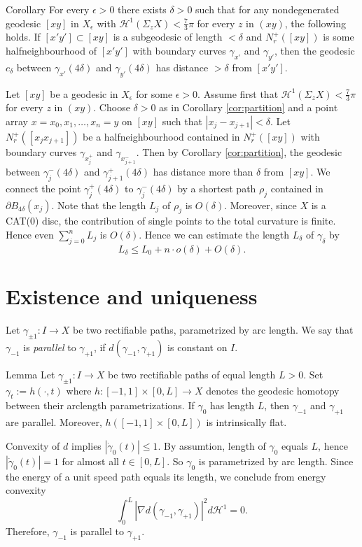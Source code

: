 \documentclass[a4paper,10pt]{amsart}
\begin{document}
\begin{thm}{Corollary}\label{cor:partition}
For every $\epsilon>0$ there exists $\delta>0$ such that for any nondegenerated geodesic $[xy]$ 
in $X_\epsilon$ with $\mathcal{H}^1(\Sigma_z X)< \frac{7}{3}\pi$
for every $z$ in $(xy)$, the following holds. If $[x'y']\subset[xy]$ is a subgeodesic of length $<\delta$ and $N^+_r([xy])$ is some halfneighbourhood of $[x'y']$ with boundary curves $\gamma_{x'}$ and $\gamma_{y'}$, 
then the geodesic $c_\delta$ between  $\gamma_{x'}(4\delta)$ and $\gamma_{y'}(4\delta)$ has distance $>\delta$
from $[x'y']$.
\end{thm}
Let $[xy]$ be a geodesic in $X_\epsilon$ for some $\epsilon>0$. Assume first that $\mathcal{H}^1(\Sigma_z X)< \frac{7}{3}\pi$
for every $z$ in $(xy)$. Choose $\delta>0$ as in Corollary \ref{cor:partition} and a point array
$x=x_0,x_1,\ldots,x_n=y$ on $[xy]$ such that $|x_j-x_{j+1}|<\delta$. Let $N_r^ +([x_j x_{j+1}])$ be a halfneighbourhood contained in $N_r^ +([x y])$
with boundary curves $\gamma_{x_j^ +}$ and $\gamma_{x_{j+1}^ -}$. Then by Corollary \ref{cor:partition}, the geodesic between $\gamma_j^ -(4\delta)$
and $\gamma_{j+1}^ +(4\delta)$ has distance more than $\delta$ from $[xy]$. We connect the point $\gamma_j^ +(4\delta)$ to $\gamma_j^ -(4\delta)$ by a shortest path $\rho_j$
contained in $\partial B_{4\delta}(x_j)$. Note that the length $L_j$ of $\rho_j$ is $O(\delta)$. Moreover, since $X$
is a CAT(0) disc, the contribution of single points to the total curvature is finite. Hence even $\sum_{j=0}^ n L_j$ is $O(\delta)$.
Hence we can estimate the length $L_\delta$ of $\gamma_\delta$ by 
$$
L_\delta\leq L_0+n\cdot o(\delta)+O(\delta).
$$

 \qeds




\section{Existence and uniqueness}

Let $\gamma_{\pm 1}:I\to X$ be two rectifiable paths, parametrized by arc length. We say that  $\gamma_{-1}$ is {\em parallel} to $\gamma_{+1}$, if $d(\gamma_{-1},\gamma_{+1})$
is constant on $I$.


\begin{thm}{Lemma}
Let $\gamma_{\pm 1}:I\to X$ be two rectifiable paths of equal length $L>0$. Set $\gamma_t:=h(\cdot,t)$ where $h:[-1,1]\times[0,L]\to X$ denotes the geodesic homotopy
between their arclength parametrizations. If $\gamma_0$ has length $L$, then $\gamma_{-1}$ and $\gamma_{+1}$ are parallel. Moreover, $h([-1,1]\times[0,L])$ is intrinsically 
flat.
\end{thm}
Convexity of $d$ implies $|\dot\gamma_0(t)|\leq 1$. By assumtion, length of $\gamma_0$ equals $L$, hence $|\dot\gamma_0(t)|=1$ for almost all $t\in[0,L]$. So $\gamma_0$
is parametrized by arc length. Since the energy of a unit speed path equals its length, we conclude from energy convexity 
$$
\int_0^L|\nabla d(\gamma_{-1},\gamma_{+1})|^2 d\mathcal{H}^1=0.
$$
Therefore, $\gamma_{-1}$ is parallel to $\gamma_{+1}$.
\end{document}
